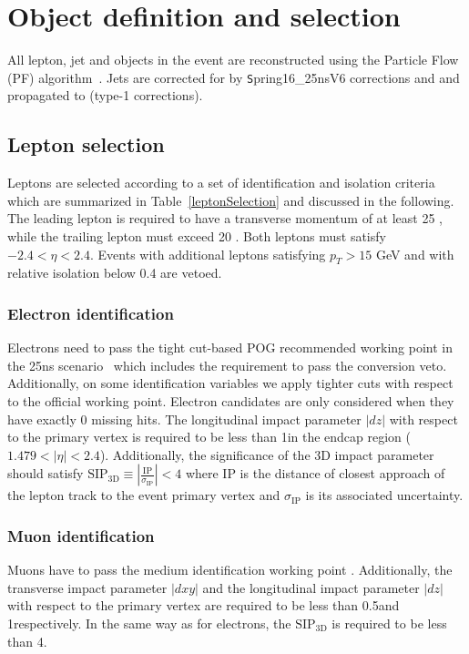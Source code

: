 \section{Object definition and selection}

  All lepton, jet and \met objects in the event are reconstructed using the Particle Flow (PF) algorithm~\citep{CMS-PAS-PFT-09-001}.
  Jets are corrected for by {\texttt Spring16\_25nsV6} corrections and and propagated to \ETmiss (type-1 corrections). 
  \subsection{Lepton selection}
    Leptons are selected according to a set of identification and isolation criteria which are summarized in Table~\ref{leptonSelection} and discussed in the following.
    The leading lepton is required to have a transverse momentum of at least 25 \GeV, while the trailing lepton must exceed 20 \GeV.
    Both leptons must satisfy $-2.4 < \eta < 2.4$. 
    Events with additional leptons satisfying $p_T> 15$ GeV and with relative isolation below 0.4 are vetoed.

    

    \subsubsection{Electron identification}
      Electrons need to pass the tight cut-based POG recommended working point in the 25ns scenario~\citep{twiki:eleId} which includes the
      requirement to pass the conversion veto. Additionally, on some identification variables we apply tighter cuts with respect to the official working point. Electron candidates 
      are only considered when they have exactly 0 missing hits. The longitudinal impact parameter $|dz|$ with respect to the primary vertex
      is required to be less than 1\mm in the endcap region ($1.479 < |\eta| < 2.4$). %
      Additionally, the significance of the 3D impact parameter should satisfy $\text{SIP}_\text{3D} \equiv \left| \frac{\text{IP}}{\sigma_\text{IP}} \right| < 4$ 
      where IP is the distance of closest approach of the lepton track to the event primary vertex and $\sigma_\text{IP}$ is its associated uncertainty. 

    \subsubsection{Muon identification}
      Muons have to pass the medium identification working point \citep{twiki:muonID}. Additionally, the transverse impact parameter $|dxy|$ and the longitudinal impact parameter $|dz|$ with respect to the primary vertex
      are required to be less than 0.5\mm and 1\mm respectively. In the same way as for electrons, the $\text{SIP}_\text{3D}$ is required to be less than 4.

